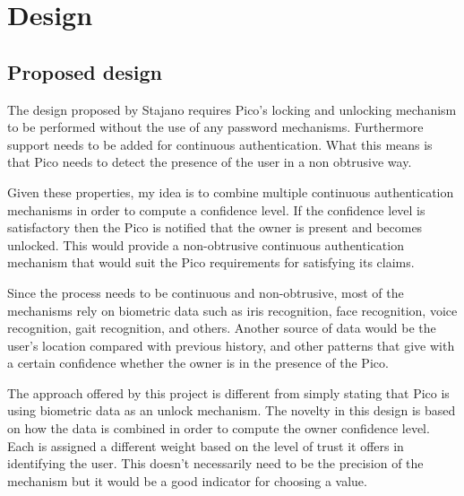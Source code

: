 
\chapter{Design} %

\label{Chapter3} %



\section{Proposed design}
The design proposed by Stajano \cite{stajano2011pico} requires Pico's  locking and unlocking mechanism to be performed without the use of any password mechanisms. Furthermore support needs to be added for continuous authentication. What this means is that Pico needs to detect the presence of the user in a non obtrusive way.

Given these properties, my idea is to combine multiple continuous authentication mechanisms in order to compute a confidence level. If the confidence level is satisfactory then the Pico is notified that the owner is present and becomes unlocked. This would provide a non-obtrusive continuous authentication mechanism that would suit the Pico requirements for satisfying its claims.

Since the process needs to be continuous and non-obtrusive, most of the mechanisms rely on biometric data such as iris recognition, face recognition, voice recognition, gait recognition, and others. Another source of data would be the user's location compared with previous history, and other patterns that give with a certain confidence whether the owner is in the presence of the Pico.

The approach offered by this project is different from simply stating that Pico is using biometric data as an unlock mechanism. The novelty in this design is based on how the data is combined in order to compute the owner confidence level. Each is assigned a different weight based on the level of trust it offers in identifying the user. This doesn't necessarily need to be the precision of the mechanism but it would be a good indicator for choosing a value.

